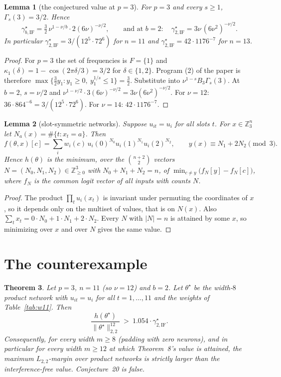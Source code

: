 \documentclass[11pt]{article}
\newtheorem{theorem}{Theorem}
\newtheorem{lemma}[theorem]{Lemma}
\theoremstyle{definition}
\newcommand{\Z}{\mathbb{Z}}
\newcommand{\gIF}{\gamma^{\star}_{b,\mathrm{IF}}}
\begin{document}
\begin{lemma}[the conjectured value at $p=3$]\label{lem:value}
For $p=3$ and every $s\ge1$, $\Gamma_s(3)=3/2$. Hence
\[
\gIF=\tfrac32\,\nu^{1-\nu/b}\cdot 2(6\nu)^{-\nu/2},\qquad\text{and at } b=2:\quad \gamma^\star_{2,\mathrm{IF}}=3\nu\,(6\nu^2)^{-\nu/2}.
\]
In particular $\gamma^\star_{2,\mathrm{IF}}=3/(12^5\cdot72^6)$ for $n=11$ and $\gamma^\star_{2,\mathrm{IF}}=42\cdot1176^{-7}$ for $n=13$.
\end{lemma}
\begin{proof}
For $p=3$ the set of frequencies is $F=\{1\}$ and $\kappa_1(\delta)=1-\cos(2\pi\delta/3)=3/2$ for $\delta\in\{1,2\}$.
Program (2) of the paper is therefore $\max\{\tfrac32 y_1: y_1\ge0,\ y_1^{1/s}\le1\}=\tfrac32$. Substitute into
$\nu^{1-s}B_3\Gamma_s(3)$. At $b=2$, $s=\nu/2$ and $\nu^{1-\nu/2}\cdot3(6\nu)^{-\nu/2}=3\nu(6\nu^2)^{-\nu/2}$.
For $\nu=12$: $36\cdot864^{-6}=3/(12^5\cdot72^6)$. For $\nu=14$: $42\cdot1176^{-7}$.
\end{proof}

\begin{lemma}[slot-symmetric networks]\label{lem:counts}
Suppose $u_{it}=u_i$ for all slots $t$. For $x\in\Z_3^n$ let $N_a(x)=\#\{t:x_t=a\}$. Then
\[
f(\theta,x)[c]=\sum_i w_i(c)\,u_i(0)^{N_0}u_i(1)^{N_1}u_i(2)^{N_2},\qquad y(x)\equiv N_1+2N_2 \pmod 3 .
\]
Hence $h(\theta)$ is the minimum, over the $\binom{n+2}{2}$ vectors $N=(N_0,N_1,N_2)\in\Z_{\ge0}^3$ with
$N_0+N_1+N_2=n$, of $\min_{c\ne y}\big(f_N[y]-f_N[c]\big)$, where $f_N$ is the common logit vector of all inputs
with counts $N$.
\end{lemma}
\begin{proof}
The product $\prod_t u_i(x_t)$ is invariant under permuting the coordinates of $x$, so it depends only on the
multiset of values, that is on $N(x)$. Also $\sum_t x_t=0\cdot N_0+1\cdot N_1+2\cdot N_2$. Every $N$ with
$|N|=n$ is attained by some $x$, so minimizing over $x$ and over $N$ gives the same value.
\end{proof}

\section{The counterexample}

\begin{theorem}\label{thm:main}
Let $p=3$, $n=11$ (so $\nu=12$) and $b=2$. Let $\theta^\star$ be the width-$8$ product network with
$u_{it}=u_i$ for all $t=1,\dots,11$ and the weights of Table~\ref{tab:w11}. Then
\[
\frac{h(\theta^\star)}{\|\theta^\star\|_{2,2}^{12}}\ >\ 1.054\cdot\gamma^\star_{2,\mathrm{IF}} .
\]
Consequently, for every width $m\ge 8$ (padding with zero neurons), and in particular for every width
$m\ge12$ at which Theorem~8's value is attained, the maximum $L_{2,2}$-margin over product networks is strictly
larger than the interference-free value. Conjecture~20 is false.
\end{theorem}
\end{document}
